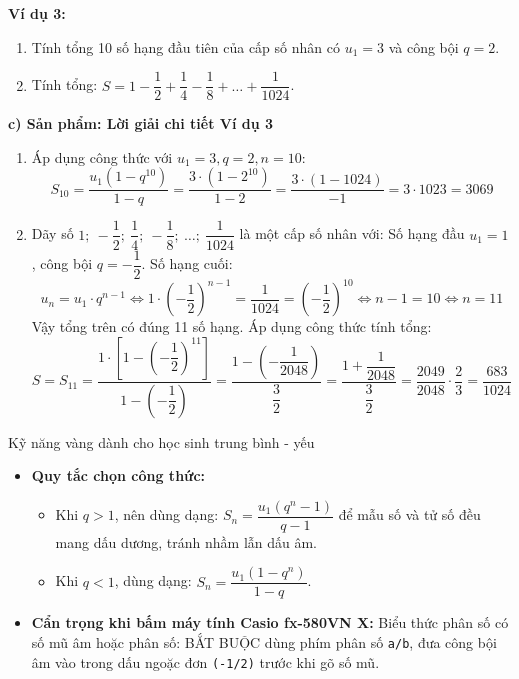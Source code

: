 \documentclass[12pt, a4paper]{article}
\begin{document}
\textbf{Ví dụ 3:}
\begin{enumerate}[leftmargin=0.6cm]
    \item Tính tổng 10 số hạng đầu tiên của cấp số nhân có $u_1 = 3$ và công bội $q = 2$.
    \item Tính tổng: $S = 1 - \dfrac{1}{2} + \dfrac{1}{4} - \dfrac{1}{8} + \dots + \dfrac{1}{1024}$.
\end{enumerate}

\noindent \textbf{c) Sản phẩm: Lời giải chi tiết Ví dụ 3}
\begin{enumerate}[leftmargin=0.6cm]
    \item Áp dụng công thức với $u_1 = 3, q = 2, n = 10$:
    $$S_{10} = \dfrac{u_1(1 - q^{10})}{1 - q} = \dfrac{3 \cdot (1 - 2^{10})}{1 - 2} = \dfrac{3 \cdot (1 - 1024)}{-1} = 3 \cdot 1023 = 3069$$
    \item Dãy số $1; \ -\dfrac{1}{2}; \ \dfrac{1}{4}; \ -\dfrac{1}{8}; \ \dots; \ \dfrac{1}{1024}$ là một cấp số nhân với:
    Số hạng đầu $u_1 = 1$, công bội $q = -\dfrac{1}{2}$.
    Số hạng cuối:
    $$u_n = u_1 \cdot q^{n-1} \iff 1 \cdot \left(-\dfrac{1}{2}\right)^{n-1} = \dfrac{1}{1024} = \left(-\dfrac{1}{2}\right)^{10} \iff n - 1 = 10 \iff n = 11$$
    Vậy tổng trên có đúng 11 số hạng. Áp dụng công thức tính tổng:
    $$S = S_{11} = \dfrac{1 \cdot \left[1 - \left(-\dfrac{1}{2}\right)^{11}\right]}{1 - \left(-\dfrac{1}{2}\right)} = \dfrac{1 - \left(-\dfrac{1}{2048}\right)}{\dfrac{3}{2}} = \dfrac{1 + \dfrac{1}{2048}}{\dfrac{3}{2}} = \dfrac{2049}{2048} \cdot \dfrac{2}{3} = \dfrac{683}{1024}$$
\end{enumerate}

\begin{scaffoldbox}{Kỹ năng vàng dành cho học sinh trung bình - yếu}
\begin{itemize}[leftmargin=0.6cm]
    \item \textbf{Quy tắc chọn công thức:}
    \begin{itemize}
        \item Khi $q > 1$, nên dùng dạng: $S_n = \dfrac{u_1(q^n - 1)}{q - 1}$ để mẫu số và tử số đều mang dấu dương, tránh nhầm lẫn dấu âm.
        \item Khi $q < 1$, dùng dạng: $S_n = \dfrac{u_1(1 - q^n)}{1 - q}$.
    \end{itemize}
    \item \textbf{Cẩn trọng khi bấm máy tính Casio fx-580VN X:}
    Biểu thức phân số có số mũ âm hoặc phân số: BẮT BUỘC dùng phím phân số \texttt{a/b}, đưa công bội âm vào trong dấu ngoặc đơn \texttt{(-1/2)} trước khi gõ số mũ.
\end{itemize}
\end{scaffoldbox}
\end{document}
